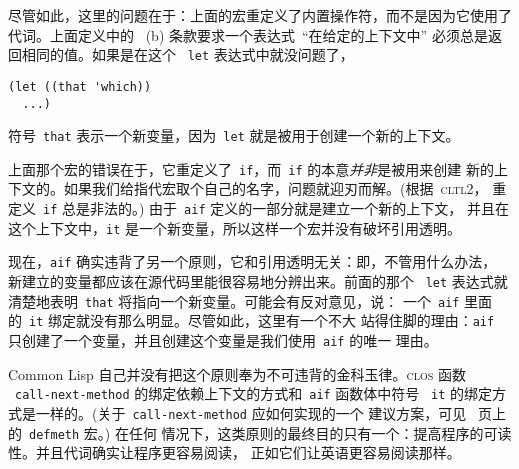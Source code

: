 尽管如此，这里的问题在于：上面的宏重定义了内置操作符，而不是因为它使用了代词。上面定义中的
~(b) 条款要求一个表达式~``在给定的上下文中'' 必须总是返回相同的值。如果是在这个
~\texttt{let} 表达式中就没问题了，
\begin{lstlisting}
(let ((that 'which))
  ...)
\end{lstlisting}
符号~\texttt{that} 表示一个新变量，因为~\texttt{let} 就是被用于创建一个新的上下文。

上面那个宏的错误在于，它重定义了~\texttt{if}，而~\texttt{if} 的本意\emph{并非}是被用来创建
新的上下文的。如果我们给指代宏取个自己的名字，问题就迎刃而解。(根据~\textsc{cltl}2，
重定义~\texttt{if} 总是非法的。) 由于~\texttt{aif} 定义的一部分就是建立一个新的上下文，
并且在这个上下文中，\texttt{it} 是一个新变量，所以这样一个宏并没有破坏引用透明。

现在，\texttt{aif} 确实违背了另一个原则，它和引用透明无关：即，不管用什么办法，
新建立的变量都应该在源代码里能很容易地分辨出来。前面的那个
~\texttt{let} 表达式就清楚地表明~\texttt{that} 将指向一个新变量。可能会有反对意见，说：
一个~\texttt{aif} 里面的~\texttt{it} 绑定就没有那么明显。尽管如此，这里有一个不大
站得住脚的理由：\texttt{aif} 只创建了一个变量，并且创建这个变量是我们使用~\texttt{aif} 的唯一
理由。

Common Lisp 自己并没有把这个原则奉为不可违背的金科玉律。\textsc{clos} 函数
~\texttt{call-next-method} 的绑定依赖上下文的方式和~\texttt{aif} 函数体中符号
~\texttt{it} 的绑定方式是一样的。(关于~\texttt{call-next-method} 应如何实现的一个
建议方案，可见~\pageref{fig:defining_methods} 页上的~\texttt{defmeth} 宏。) 在任何
情况下，这类原则的最终目的只有一个：提高程序的可读性。并且代词确实让程序更容易阅读，
正如它们让英语更容易阅读那样。

